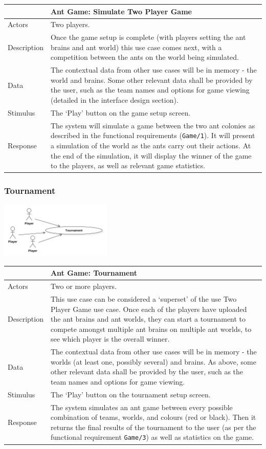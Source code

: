 \documentclass[11pt]{article}
\begin{document}
\begin{longtable}[c]{@{}p{}p{}@{}}
\toprule
& Ant Game: Simulate Two Player Game\tabularnewline
\midrule

Actors & Two players.\tabularnewline
Description & Once the game setup is complete (with players setting the
ant brains and ant world) this use case comes next, with a competition
between the ants on the world being simulated.\tabularnewline
Data & The contextual data from other use cases will be in memory - the
world and brains. Some other relevant data shall be provided by the
user, such as the team names and options for game viewing (detailed in
the interface design section).\tabularnewline
Stimulus & The `Play' button on the game setup screen.\tabularnewline
Response & The system will simulate a game between the two ant colonies
as described in the functional requirements (\texttt{Game/1}). It will
present a simulation of the world as the ants carry out their actions.
At the end of the simulation, it will display the winner of the game to
the players, as well as relevant game statistics.\tabularnewline
\bottomrule
\end{longtable}

\subsubsection{Tournament}\label{tournament}

\begin{center}
\includegraphics[width=0.4\textwidth]{diagrams/use-case-5-tournament.png}
\end{center}

\begin{longtable}[c]{@{}p{}p{}@{}}
\toprule
& Ant Game: Tournament\tabularnewline
\midrule

Actors & Two or more players.\tabularnewline
Description & This use case can be considered a `superset' of the use
Two Player Game use case. Once each of the players have uploaded the ant
brains and ant worlds, they can start a tournament to compete amongst
multiple ant brains on multiple ant worlds, to see which player is the
overall winner.\tabularnewline
Data & The contextual data from other use cases will be in memory - the
worlds (at least one, possibly several) and brains. As above, some other
relevant data shall be provided by the user, such as the team names and
options for game viewing.\tabularnewline
Stimulus & The `Play' button on the tournament setup
screen.\tabularnewline
Response & The system simulates an ant game between every possible
combination of teams, worlds, and colours (red or black). Then it
returns the final results of the tournament to the user (as per the
functional requirement \texttt{Game/3}) as well as statistics on the
game.\tabularnewline
\bottomrule
\end{longtable}
\end{document}
